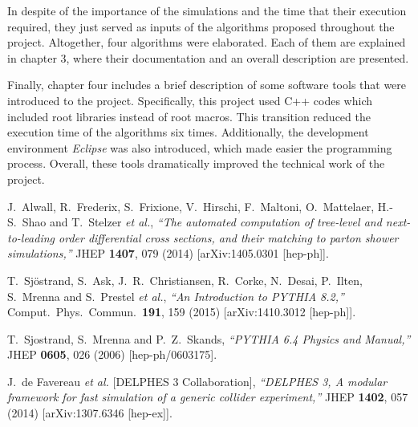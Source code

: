 \documentclass[12pt, oneside]{book}              %
\begin{document}
In despite of the importance of the simulations and the time that their execution required, they just served as inputs of 
the algorithms proposed throughout the project. Altogether, four algorithms were elaborated. Each of them are explained in
chapter 3, where their documentation and an overall description are presented. 

Finally, chapter four includes a brief description of some software tools that were introduced to the project. Specifically, 
this project used C++ codes which included root libraries instead of root macros. This transition reduced the execution time
of the algorithms six times. Additionally, the development environment \emph{Eclipse} was also introduced, which made easier
the programming process. Overall, these tools dramatically improved the technical work of the project.


\begin{thebibliography}{99}

	  J.~Alwall, R.~Frederix, S.~Frixione, V.~Hirschi, F.~Maltoni, O.~Mattelaer, H.-S.~Shao and T.~Stelzer {\it et al.},
	  \emph{``The automated computation of tree-level and next-to-leading order differential cross sections, and their matching to parton shower simulations,''}
	  JHEP {\bf 1407}, 079 (2014)
	  [arXiv:1405.0301 [hep-ph]].
	  
	  T.~Sjöstrand, S.~Ask, J.~R.~Christiansen, R.~Corke, N.~Desai, P.~Ilten, S.~Mrenna and S.~Prestel {\it et al.},
	  \emph{``An Introduction to PYTHIA 8.2,''}
	  Comput.\ Phys.\ Commun.\  {\bf 191}, 159 (2015)
	  [arXiv:1410.3012 [hep-ph]].
	  
	  T.~Sjostrand, S.~Mrenna and P.~Z.~Skands,
	  \emph{``PYTHIA 6.4 Physics and Manual,''}
	  JHEP {\bf 0605}, 026 (2006)
	  [hep-ph/0603175].
	  
	  J.~de Favereau {\it et al.}  [DELPHES 3 Collaboration],
	  \emph{``DELPHES 3, A modular framework for fast simulation of a generic collider experiment,''}
	  JHEP {\bf 1402}, 057 (2014)
	  [arXiv:1307.6346 [hep-ex]].

	  

\end{thebibliography}
	
\end{document}

